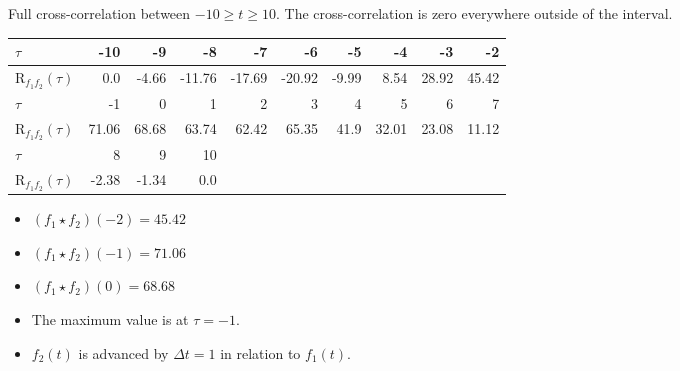 \begin{solution}
	\begin{tasks}
		\task
		Full cross-correlation between $-10 \geq t \geq 10$. The cross-correlation is zero everywhere outside of the interval.
		\begin{table}[H]
			\centering
			\begin{tabular}{|l|r|r|r|r|r|r|r|r|r|}
				\hline
				$\tau$ & -10 & -9 & -8 & -7 & -6 & -5 & -4 & -3 & -2 \\
				\hline
				$\mathrm{R}_{f_1 f_2}(\tau)$ & 0.0   &  -4.66 & -11.76 & -17.69 & -20.92 &  -9.99 &   8.54 &  28.92 & 45.42 \\
				\hline
				\hline
				$\tau$ & -1 & 0 & 1 & 2 & 3 & 4 & 5 & 6 & 7 \\
				\hline
				$\mathrm{R}_{f_1 f_2}(\tau)$ &  71.06 &  68.68 &  63.74 &  62.42 &  65.35 &  41.9  &  32.01 & 23.08 &  11.12 \\
				\hline
				\hline
				$\tau$ & 8 & 9 & 10 & & & & & & \\
				\hline
				$\mathrm{R}_{f_1 f_2}(\tau)$ & -2.38 &  -1.34 &   0.0 & & & & & & \\
				\hline
			\end{tabular}
		\end{table}
		\begin{itemize}
			\item $\left(f_1 \star f_2\right)(-2) = 45.42$
			\item $\left(f_1 \star f_2\right)(-1) = 71.06$
			\item $\left(f_1 \star f_2\right)(0) = 68.68$
		\end{itemize}
	
		\task
		\begin{itemize}
			\item The maximum value is at $\tau = -1$.
			\item $f_2(t)$ is advanced by $\Delta t = 1$ in relation to $f_1(t)$.
		\end{itemize}
	

\end{tasks}
\end{solution}
